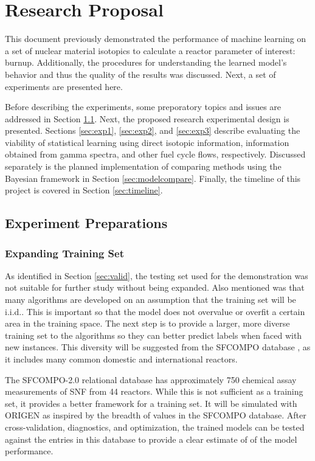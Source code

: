 \chapter{Research Proposal}
\label{ch:proposal}

This document previously demonstrated the performance of machine learning on a
set of nuclear material isotopics to calculate a reactor parameter of interest:
burnup.  Additionally, the procedures for understanding the learned model's
behavior and thus the quality of the results was discussed.  Next, a set of
experiments are presented here. 

Before describing the experiments, some preporatory topics and issues are
addressed in Section \ref{sec:prep}.  Next, the proposed research experimental
design is presented. Sections \ref{sec:exp1}, \ref{sec:exp2}, and
\ref{sec:exp3} describe evaluating the viability of statistical learning using
direct isotopic information, information obtained from gamma spectra, and other
fuel cycle flows, respectively.  Discussed separately is the planned
implementation of comparing methods using the Bayesian framework in Section
\ref{sec:modelcompare}. Finally, the timeline of this project is covered in
Section \ref{sec:timeline}.

\section{Experiment Preparations}
\label{sec:prep}

\subsection*{Expanding Training Set}

As identified in Section \ref{sec:valid}, the testing set used for the
demonstration was not suitable for further study without being expanded. Also
mentioned was that many algorithms are developed on an assumption that the
training set will be \acrfull{i.i.d.}.  This is important so that the model
does not overvalue or overfit a certain area in the training space.  The next
step is to provide a larger, more diverse training set to the algorithms so
they can better predict labels when faced with new instances. This diversity
will be suggested from the \gls{SFCOMPO} database \cite{sfcompo}, as it
includes many common domestic and international reactors.

The SFCOMPO-2.0 relational database \cite{sfcompo} has approximately 750
chemical assay measurements of \gls{SNF} from 44 reactors. While this is not
sufficient as a training set, it provides a better framework for a training
set. It will be simulated with \gls{ORIGEN} as inspired by the breadth of
values in the \gls{SFCOMPO} database. After cross-validation, diagnostics, and
optimization, the trained models can be tested against the entries in this
database to provide a clear estimate of of the model performance. 

